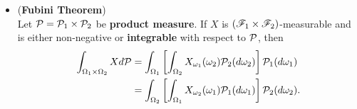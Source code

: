 \documentclass[11pt]{article}
\begin{document}
\begin{itemize}
\item \begin{theorem} (\textbf{Fubini Theorem}) \citep{resnick2013probability}\\
Let ${\mathcal P} = {\mathcal P}_1 \times {\mathcal P}_2$ be \textbf{product measure}. If $X$ is $({\mathscr F}_{1}\times {\mathscr F}_{2})$-measurable and is either non-negative or \textbf{integrable} with respect to ${\mathcal P}$, then
\begin{align*}
\int_{\Omega_1 \times \Omega_2} X d{\mathcal P} &= \int_{\Omega_1} \left[\int_{\Omega_2}X_{\omega_1}(\omega_2){\mathcal P}_2(d\omega_2)\right]{\mathcal P}_1(d\omega_1)\\
&= \int_{\Omega_2} \left[\int_{\Omega_1} X_{\omega_2}(\omega_1){\mathcal P}_1(d\omega_1)\right]{\mathcal P}_2(d\omega_2).
\end{align*}
\end{theorem}
\end{itemize}
\newpage


\end{document}
